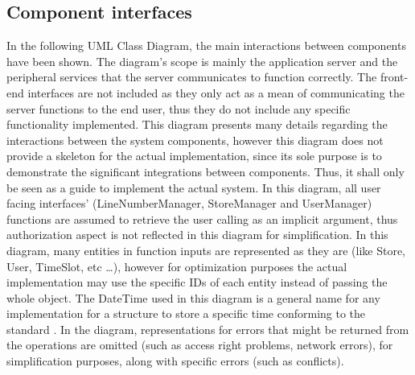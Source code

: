
\subsection{Component interfaces}
In the following UML Class Diagram, the main interactions between components have been shown.
The diagram's scope is mainly the application server and the peripheral services that the server communicates to function correctly.
The front-end interfaces are not included as they only act as a mean of communicating the server functions to the end user, thus they do not include any specific functionality implemented.
This diagram presents many details regarding the interactions between the system components, however this diagram does not provide a skeleton for the actual implementation, since its sole purpose is to demonstrate the significant integrations between components.
Thus, it shall only be seen as a guide to implement the actual system.
In this diagram, all user facing interfaces' (LineNumberManager, StoreManager and UserManager) functions are assumed to retrieve the user calling as an implicit argument, thus authorization aspect is not reflected in this diagram for simplification.
In this diagram, many entities in function inputs are represented as they are (like Store, User, TimeSlot, etc \ldots), however for optimization purposes the actual implementation may use the specific IDs of each entity instead of passing the whole object.
The DateTime used in this diagram is a general name for any implementation for a structure to store a specific time conforming to the standard \cite{}.
In the diagram, representations for errors that might be returned from the operations are omitted (such as access right problems, network errors), for simplification purposes, along with specific errors (such as conflicts).

